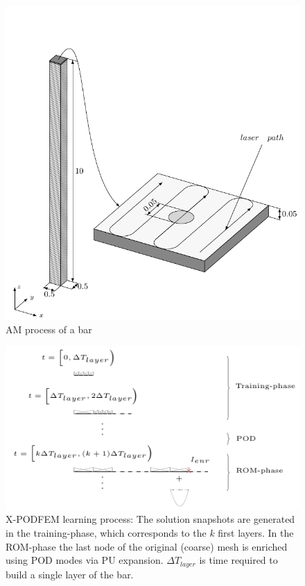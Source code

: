 \documentclass[3p]{article}
\begin{document}
\begin{figure}[!h]
\centering
  \includegraphics[width=0.8\linewidth]{Pictures/AMBar1D.pdf}
  \caption{AM process of a bar}
  \label{fig:AMBar1D}
  
\end{figure}

\begin{figure}[!h]

  \includegraphics[width=\linewidth]{Pictures/OneDimensionalModelProcess.pdf}
  
 \caption{X-PODFEM learning process: The solution snapshots are generated in the training-phase, which corresponds to the $k$ first layers. In the ROM-phase the last node of the original (coarse) mesh is enriched using POD modes via PU expansion. $\Delta T_{layer}$ is time required to build a single layer of the bar.}
  
  \label{fig:XPODFEMProcess}
  
\end{figure}
\end{document}
